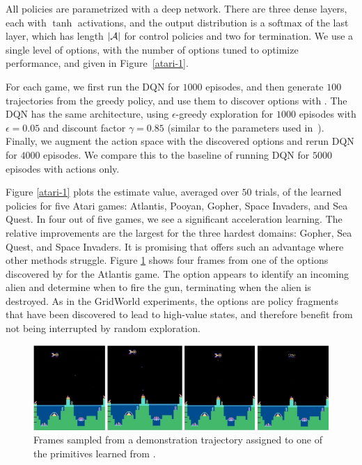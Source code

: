 All policies are parametrized with a deep network. There are three dense layers, each with $\tanh$ activations, and the output distribution is a $\mathrm{softmax}$ of the last layer, which has length $|\mathcal{A}|$ for control policies and two for termination. We use a single level of options, with the number of options tuned to optimize performance, and given in Figure~\ref{atari-1}.

For each game, we first run the DQN for $1000$ episodes, and then generate $100$ trajectories from the greedy policy, and use them to discover options with \alg.
The DQN has the same architecture, using $\epsilon$-greedy exploration for $1000$ episodes with $\epsilon=0.05$ and discount factor $\gamma=0.85$ (similar to the parameters used in~\citep{sygnowski2016learning}). 
Finally, we augment the action space with the discovered options and rerun DQN for $4000$ episodes. 
We compare this to the baseline of running DQN for $5000$ episodes with actions only.

Figure \ref{atari-1} plots the estimate value, averaged over $50$ trials, of the learned policies for five Atari games: Atlantis, Pooyan, Gopher, Space Invaders, and Sea Quest.
In four out of five games, we see a significant acceleration learning.
The relative improvements are the largest for the three hardest domains: Gopher, Sea Quest, and Space Invaders.
It is promising that \alg offers such an advantage where other methods struggle. 
Figure \ref{atari-3} shows four frames from one of the options discovered by \alg for the Atlantis game. %
The option appears to identify an incoming alien and determine when to fire the gun, terminating when the alien is destroyed.
As in the GridWorld experiments, the options are policy fragments that have been discovered to lead to high-value states, and therefore benefit from not being interrupted by random exploration.

\begin{figure}[t]
    \centering
    \includegraphics[width=\columnwidth]{ddco-experiments/atlantis-primitive.png}
    \caption{Frames sampled from a demonstration trajectory assigned to one of the primitives learned from \alg.  \label{atari-3}}
\end{figure}


